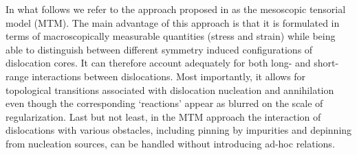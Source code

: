 \documentclass[CRPHYS,Unicode,manuscript]{cedram}
\begin{document}
In what follows we refer to the approach proposed in \cite{Baggio2019-rs}  as the  mesoscopic tensorial model  (MTM).  The main advantage of this approach is that it is formulated in terms of macroscopically measurable quantities (stress and strain)  while being able to distinguish between different symmetry induced  configurations of dislocation cores. It can therefore account  adequately  for both long- and short-range interactions between dislocations.  Most importantly, it allows for topological transitions associated with dislocation nucleation and annihilation
 even though the corresponding `reactions' appear as blurred  on the scale of  regularization. Last but not least, in the MTM  approach the interaction of dislocations   with various obstacles,  including pinning  by impurities and  depinning from nucleation sources, can be handled  without introducing  ad-hoc relations. 

















%

  










\end{document}
